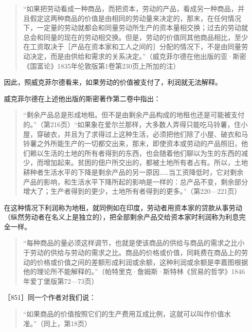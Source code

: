 \begin{quote}{“如果把劳动看成一种商品，而把资本，劳动的产品，看成另一种商品，并且假定这两种商品的价值是由相同的劳动量来决定的，那末，在任何情况下，一定量的劳动就都会和同量劳动所生产的资本量相交换；过去的劳动就总会和同量的现在的劳动相交换。但是，劳动的价值同其他商品相比，至少在工资取决于［产品在资本家和工人之间的］分配的情况下，不是由同量劳动决定，而是由供给和需求的关系决定。”（威克菲尔德在他出版的亚·斯密《国富论》1835年伦敦版第1卷第230页上所加的注）}\end{quote}

因此，照威克菲尔德看来，如果劳动的价值被支付了，利润就无法解释。

威克菲尔德在上述他出版的斯密著作第二卷中指出：

\begin{quote}{“剩余产品总是形成地租。但不是由剩余产品构成的地租也还是可能被支付的。”（第216页）“如果象在爱尔兰那样，大多数人弄得只能吃马铃薯，住小屋，穿破衣，并且为了求得过上这种生活，必须把他们除了小屋、破衣和马铃薯之外所能生产的一切都交出来，那末，即使资本或劳动的产品照旧，他们赖以生活的土地的所有者得到的东西，也会随着他们聊以为生的东西的减少，而增加起来。贫困的佃户所交出的，都被土地所有者占有。所以，土地耕种者生活水平的下降是剩余产品的另一原因……当工资降低时，它对剩余产品的影响，和生活水平下降所起的影响是一样的：总产品不变，剩余部分增大了；生产者得到的更少，土地所有者得到的更多。”（第220—221页）}\end{quote}

在这种情况下利润称为地租，就同例如在印度，劳动者用资本家的贷款从事劳动（纵然劳动者在名义上是独立的），把全部剩余产品交给资本家时利润称为利息完全一样。


\begin{quote}{“每种商品的量必须这样调节，也就是使该商品的供给与商品的需求之比小于劳动的供给与劳动的需求之比。商品的价格或价值，同耗费在商品上的劳动的价格或价值之间的差额形成利润或余额，这种利润或余额是李嘉图根据他的理论所不能解释的。”（帕特里克·詹姆斯·斯特林《贸易的哲学》1846年爱丁堡版第72—73页）}\end{quote}

［851］同一个作者对我们说：

\begin{quote}{“如果商品的价值按照它们的生产费用互成比例，这就可以叫作价值水准。”（同上，第18页）}\end{quote}

